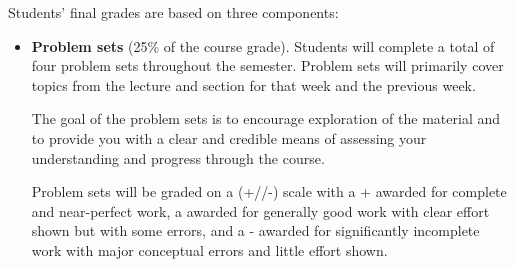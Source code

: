 \documentclass[11pt, article, oneside]{memoir}
\theoremstyle{Assumption}
\begin{document}
Students’ final grades are based on three components:
\begin{itemize}

\item \textbf{Problem sets} (25\% of the course grade). Students will complete a total of four problem sets throughout the semester. Problem sets will primarily cover topics from the lecture and section for that week and the previous week.

The goal of the problem sets is to encourage exploration of the material and to provide you with a clear and credible means of assessing your understanding and progress through the course.

Problem sets will be graded on a (+/\checkmark/-) scale with a + awarded for complete and near-perfect work, a \checkmark awarded for generally good work with clear effort shown but with some errors, and a - awarded for significantly incomplete work with major conceptual errors and little effort shown.
 

\end{itemize}
\end{document}
